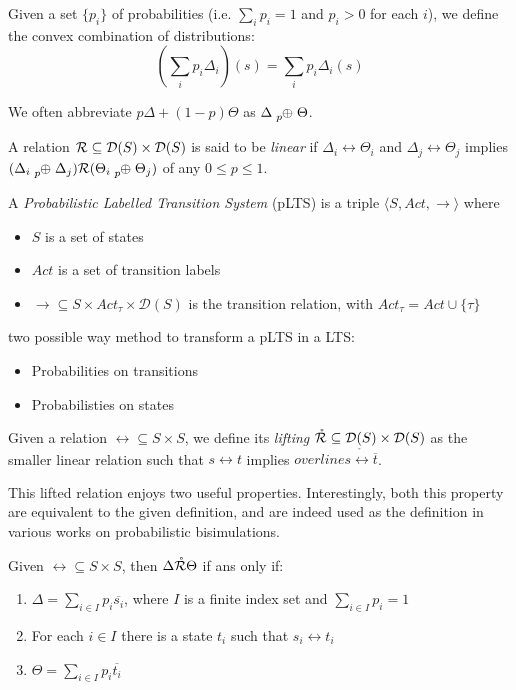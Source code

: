 Given a set $\{p_i\}$ of probabilities (i.e. $\sum_i p_i = 1$ and $p_i > 0$ for each $i$), we define the convex combination of distributions:
\[
\left(\sum_i p_i \Delta_i\right)(s) = \sum_i p_i \Delta_i(s)
\]

We often abbreviate $p \Delta + (1-p) \Theta$ as $\Delta \psum{p} \Theta$.


A relation $\mathcal{R} \subseteq \mathcal{D}(S) \times \mathcal{D}(S)$ is said to be \textit{linear} if $\Delta_i \rel \Theta_i$ and $\Delta_j \rel \Theta_j$ implies $(\Delta_i \psum{p} \Delta_j) \rel (\Theta_i \psum{p} \Theta_j)$ of any $0 \leq p \leq 1$.


A \textit{Probabilistic Labelled Transition System} (pLTS) is a triple $\langle S , Act, \rightarrow \rangle$ where \begin{itemize}
\item $S$ is a set of states
\item $Act$ is a set of transition labels
\item $\rightarrow 	\subseteq S\times Act_\tau \times \mathcal{D}(S)$ is the transition relation, with $Act_\tau = Act \cup \{\tau\}$
\end{itemize} 

two possible way method to transform a pLTS in a LTS: \begin{itemize}
\item Probabilities on transitions
\item Probabilisties on states
\end{itemize}


Given a relation $\rel \subseteq S \times S$, we define its \textit{lifting} $\mathring{\mathcal{R}} \subseteq \mathcal{D}(S) \times \mathcal{D}(S)$ as the smaller linear relation such that $s \rel t$ implies $overline{s} \mathring{\rel} \overline{t}$.



This lifted relation enjoys two useful properties. Interestingly, both this property are equivalent to the given definition, and are indeed used as the definition in various works on probabilistic bisimulations.

Given $\rel \subseteq S \times S$, then $\Delta \mathring{\mathcal{R}} \Theta$ if ans only if: \begin{enumerate}
\item $\Delta = \sum_{i \in I} p_i \overline{s_i}$, where $I$ is a finite index set and $\sum_{i \in I}p_i = 1$
\item For each $i \in I$ there is a state $t_i$ such that $s_i \rel t_i$
\item $\Theta = \sum_{i\in I}p_i\overline{t_i}$ 
\end{enumerate}

